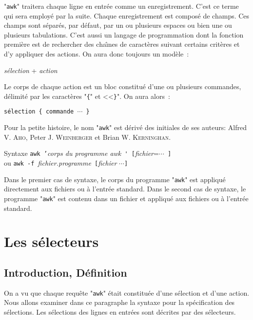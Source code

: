 "\texttt{awk}" traitera chaque ligne en entr{\'e}e comme un
enregistrement. C'est ce terme qui sera
employ{\'e} par la suite. Chaque enregistrement est compos{\'e} de champs. Ces
champs sont s{\'e}par{\'e}s, par d{\'e}faut, par un ou plusieurs espaces ou bien une ou plusieurs tabulations. C'est aussi un langage de programmation dont la fonction premi{\`e}re est de rechercher des cha{\^\i}nes de caract{\`e}res suivant certains crit{\`e}res et d'y appliquer des actions. On aura donc toujours un mod{\`e}le~: \centerline{\textsl{s{\'e}lection} +
\textsl{action}}

Le corps de chaque action est un bloc constitu{\'e} d'une ou plusieurs commandes, d{\'e}limit{\'e} par les caract{\`e}res "\verb={=" et <<\verb=}=". On aura alors~:
\begin{center}
{\tt s{\'e}lection \{ commande }$\cdots$\verb= }=
\end{center}

Pour la petite histoire, le nom "\texttt{awk}" est d{\'e}riv{\'e} des initiales de ses auteurs: Alfred V. \textsc{Aho}, Peter J. \textsc{Weinberger} et Brian W.
\textsc{Kerninghan}.

\begin{definition}{Syntaxe}
\texttt{awk '}\textsl{corps du programme awk}\verb= ' [=\textsl{fichier}=$\cdots$\verb= ]=\\
ou \texttt{awk -f }\textsl{fichier.programme}\verb= [=\textsl{fichier} $\cdots$\verb=]=
\end{definition}

Dans le premier cas de syntaxe, le corps du programme "\texttt{awk}" est appliqu{\'e} directement aux fichiers ou {\`a} l'entr{\'e}e standard. Dans le second cas de syntaxe, le programme "\texttt{awk}" est contenu dans un fichier et appliqu{\'e} aux fichiers ou {\`a} l'entr{\'e}e standard.

\section{Les s{\'e}lecteurs}

\subsection{Introduction, D{\'e}finition}

On a vu que chaque requ{\^e}te "\texttt{awk}" {\'e}tait constitu{\'e}e d'une s{\'e}lection et d'une action. Nous allons examiner dans ce paragraphe la syntaxe pour la sp{\'e}cification des s{\'e}lections. Les s{\'e}lections des lignes en entr{\'e}es sont d{\'e}crites par des s{\'e}lecteurs.

